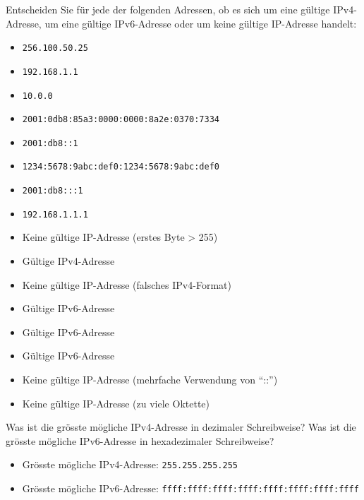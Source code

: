 \begin{myexercise}
	Entscheiden Sie für jede der folgenden Adressen, ob es sich um eine gültige \gls{IP}v4-Adresse, um eine gültige \gls{IP}v6-Adresse oder um keine gültige \gls{IP}-Adresse handelt:
	\begin{itemize}
		\item \texttt{256.100.50.25}
		\item \texttt{192.168.1.1}
		\item \texttt{10.0.0}
		\item \texttt{2001:0db8:85a3:0000:0000:8a2e:0370:7334}
		\item \texttt{2001:db8::1}
		\item \texttt{1234:5678:9abc:def0:1234:5678:9abc:def0}
		\item \texttt{2001:db8:::1}
		\item \texttt{192.168.1.1.1}
	\end{itemize}
	\begin{myanswer}
		\begin{itemize}
			\item Keine gültige \gls{IP}-Adresse (erstes Byte > 255)
			\item Gültige \gls{IP}v4-Adresse
			\item Keine gültige \gls{IP}-Adresse (falsches \gls{IP}v4-Format)
			\item Gültige \gls{IP}v6-Adresse
			\item Gültige \gls{IP}v6-Adresse
			\item Gültige \gls{IP}v6-Adresse
			\item Keine gültige \gls{IP}-Adresse (mehrfache Verwendung von \enquote{::})
			\item Keine gültige \gls{IP}-Adresse (zu viele Oktette)
		\end{itemize}
	\end{myanswer}
\end{myexercise}

\begin{myexercise}
	Was ist die grösste mögliche \gls{IP}v4-Adresse in dezimaler Schreibweise? Was ist die grösste mögliche \gls{IP}v6-Adresse in hexadezimaler Schreibweise?
	\begin{myanswer}
		\begin{itemize}
			\item Grösste mögliche \gls{IP}v4-Adresse: \texttt{255.255.255.255}
			\item Grösste mögliche \gls{IP}v6-Adresse: \texttt{ffff:ffff:ffff:ffff:ffff:ffff:ffff:ffff}
		\end{itemize}
	\end{myanswer}
\end{myexercise}

